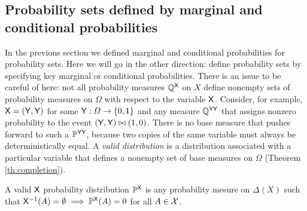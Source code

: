 

\subsection{Probability sets defined by marginal and conditional probabilities}

In the previous section we defined marginal and conditional probabilities for probability sets. Here we will go in the other direction: define probability sets by specifying key marginal or conditional probabilities. There is an issue to be careful of here: not all probability measures $\mathbb{Q}^{\mathsf{X}}$ on $X$ define nonempty sets of probability measures on $\Omega$ with respect to the variable $\mathsf{X}$. Consider, for example, $\mathsf{X}=(\mathsf{Y},\mathsf{Y})$ for some $\mathsf{Y}:\Omega\to \{0,1\}$ and any measure $\mathbb{Q}^{\mathsf{YY}}$ that assigns nonzero probability to the event $(\mathsf{Y},\mathsf{Y})\bowtie (1,0)$. There is no base measure that pushes forward to such a $\mathbb{P}^{\mathsf{YY}}$, because two copies of the same variable must always be deterministically equal. A \emph{valid distribution} is a distribution associated with a particular variable that defines a nonempty set of base measures on $\Omega$ (Theorem \ref{th:completion}).

\begin{definition}\label{def:valid_dist}
A valid $\mathsf{X}$ probability distribution $\mathbb{P}^{\mathsf{X}}$ is any probability mesure on $\Delta(X)$ such that $\mathsf{X}^{-1}(A)=\emptyset\implies \mathbb{P}^{\mathsf{X}}(A) = 0$ for all $A\in\mathcal{X}$.
\end{definition}

